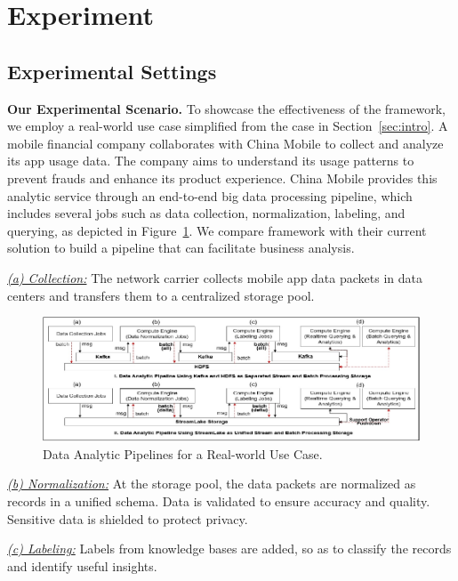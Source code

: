 \section{Experiment} 
\label{sec:exp}

\subsection{Experimental Settings}


\noindent \textbf{Our Experimental Scenario.} To showcase the effectiveness of the \sys framework, we employ a real-world use case simplified from the case in Section~\ref{sec:intro}.   A mobile financial  company collaborates with China Mobile to collect and analyze its app usage data. The company aims to understand its  usage patterns to prevent frauds and enhance its product experience. 
China Mobile provides this analytic service through an end-to-end big data processing pipeline, which includes several jobs such as data collection, normalization, labeling, and querying, as depicted in Figure~\ref{exp:fig:case}.
We compare  \sys framework with their current solution to build a  pipeline that can facilitate business analysis.

\noindent \underline{\textit{(a) Collection:}}  The network carrier collects mobile app data packets in  data centers and transfers them to a centralized storage pool.


 \begin{figure}[htbp]
	\includegraphics[scale=0.95]{figures/case}
	\centering
	\vspace{-1em}
	\caption{Data Analytic Pipelines for a  Real-world Use Case.}
	\label{exp:fig:case}
	\vspace{-1em}
\end{figure}
\noindent \underline{\textit{(b) Normalization:}} At the  storage pool, the data packets are normalized as records in a unified schema. Data is validated to ensure accuracy and quality. Sensitive data is shielded to protect  privacy. 

\noindent \underline{\textit{(c) Labeling:}} Labels from knowledge bases are added, so as to classify the records and identify useful insights.

